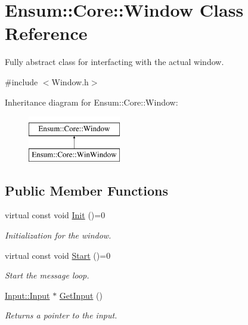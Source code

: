 \hypertarget{class_ensum_1_1_core_1_1_window}{}\section{Ensum\+:\+:Core\+:\+:Window Class Reference}
\label{class_ensum_1_1_core_1_1_window}


Fully abstract class for interfacting with the actual window.  




{\ttfamily \#include $<$Window.\+h$>$}

Inheritance diagram for Ensum\+:\+:Core\+:\+:Window\+:\begin{figure}[H]
\begin{center}
\leavevmode
\includegraphics[height=2.000000cm]{class_ensum_1_1_core_1_1_window}
\end{center}
\end{figure}
\subsection*{Public Member Functions}
\begin{DoxyCompactItemize}
\item 
virtual const void \hyperlink{class_ensum_1_1_core_1_1_window_a43f467e7e5ea83f3a9b990b6edc2ec46}{Init} ()=0\hypertarget{class_ensum_1_1_core_1_1_window_a43f467e7e5ea83f3a9b990b6edc2ec46}{}\label{class_ensum_1_1_core_1_1_window_a43f467e7e5ea83f3a9b990b6edc2ec46}

\begin{DoxyCompactList}\small\item\em Initialization for the window. \end{DoxyCompactList}\item 
virtual const void \hyperlink{class_ensum_1_1_core_1_1_window_aeafece8bb46d29de1de3ddf092662195}{Start} ()=0\hypertarget{class_ensum_1_1_core_1_1_window_aeafece8bb46d29de1de3ddf092662195}{}\label{class_ensum_1_1_core_1_1_window_aeafece8bb46d29de1de3ddf092662195}

\begin{DoxyCompactList}\small\item\em Start the message loop. \end{DoxyCompactList}\item 
\hyperlink{class_ensum_1_1_input_1_1_input}{Input\+::\+Input} $\ast$ \hyperlink{class_ensum_1_1_core_1_1_window_af746ffdd0281b2722d162fbf96c3542b}{Get\+Input} ()\hypertarget{class_ensum_1_1_core_1_1_window_af746ffdd0281b2722d162fbf96c3542b}{}\label{class_ensum_1_1_core_1_1_window_af746ffdd0281b2722d162fbf96c3542b}

\begin{DoxyCompactList}\small\item\em Returns a pointer to the input. \end{DoxyCompactList}\end{DoxyCompactItemize}
